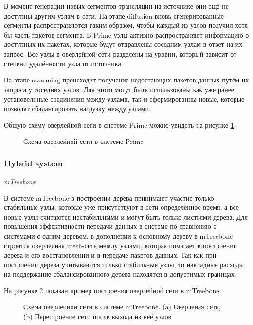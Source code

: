 		В момент генерации новых сегментов трансляции на источнике они ещё не доступны другим узлам в сети. На этапе
		diffusion вновь сгенерированные сегменты распространяются таким образом, чтобы каждый из узлов получил хотя бы
		часть пакетов сегмента. В Prime узлы активно распространяют информацию о доступных их пакетах, которые будут
		отправлены соседним узлам в ответ на их запрос. Все узлы в оверлейной сети разделены на уровни, который зависит
		от степени удалённости узла от источника.

		На этапе swarming происходит получение недостающих пакетов данных путём их запроса у соседних узлов. Для этого
		могут быть использованы как уже ранее установелнные соединения между узлами, так и сформированны новые, которые
		позволят сбалансировать нагрузку между узлами.

		Общую схему оверлейной сети в системе Prime можно увидеть на рисунке \ref{img:prime-overlay}.

		\begin{figure}[h]
			\caption{Схема оверлейной сети в системе Prime}
			\label{img:prime-overlay}
		\end{figure}

		\subsubsection{Hybrid system}

		\textit{mTreebone}

		В системе mTreebone в построении дерева принимают участие только стабильные узлы, которые уже присутствуют в
		сети определённое время, а все новые узлы считаются нестабильными и могут быть только листьями дерева. Для
		повышения эффективности передачи данных в системе по сравнению с системами с одним деревом, в дополнении к
		основному дереву в mTreebone строится оверлейная mesh-сеть между узлами, которая помагает в построении дерева и
		его восстановлении и в передаче пакетов данных. Так как при построении дерева учитываются только стабильные узлы,
		то накладные расходы на поддержание сбалансированного дерева находятся в допустимых границах.

		На рисунке \ref{img:mtreebone-overlay} показан пример построения оверлейной сети в mTreebone.
		\begin{figure}[h]
			\caption{Схема оверлейной сети в системе mTreebone. (a) Оверленая сеть, (b) Перестроение сети после
			выхода из неё узлов}
			\label{img:mtreebone-overlay}
		\end{figure}

